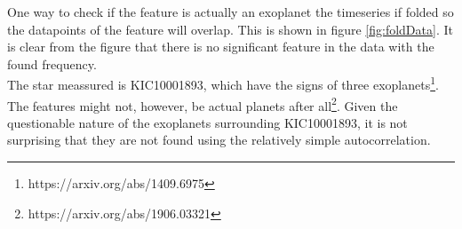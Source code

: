 One way to check if the feature is actually an exoplanet the timeseries if folded so the datapoints of the feature will overlap. This is shown in figure \autoref{fig:foldData}. It is clear from the figure that there is no significant feature in the data with the found frequency.\\
The star meassured is KIC10001893, which have the signs of three exoplanets\footnote{https://arxiv.org/abs/1409.6975}. The features might not, however, be actual planets after all\footnote{https://arxiv.org/abs/1906.03321}. Given the questionable nature of the exoplanets surrounding KIC10001893, it is not surprising that they are not found using the relatively simple autocorrelation.